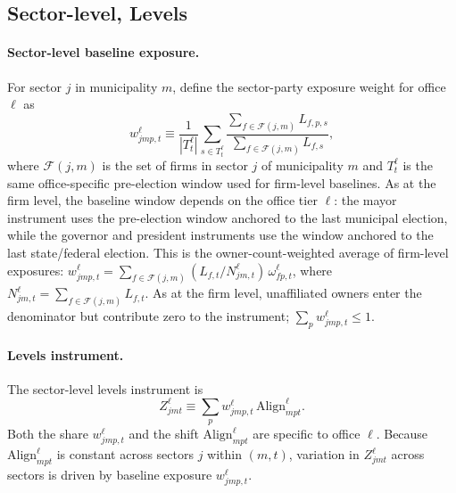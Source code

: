 \documentclass{article}
\newcommand{\Align}{\mathrm{Align}}
\begin{document}
\subsection{Sector-level, Levels}

\paragraph{Sector-level baseline exposure.}
For sector $j$ in municipality $m$, define the sector-party exposure weight for office $\ell$ as
\[
  w^\ell_{jmp,t} \equiv
  \frac{1}{|T^\ell_t|}\sum_{s\in T^\ell_t}
  \frac{\sum_{f\in\mathcal{F}(j,m)} L_{f,p,s}}
       {\sum_{f\in\mathcal{F}(j,m)} L_{f,s}},
\]
where $\mathcal{F}(j,m)$ is the set of firms in sector $j$ of municipality $m$
and $T^\ell_t$ is the same office-specific pre-election window used for firm-level baselines.
As at the firm level, the baseline window depends on the office tier $\ell$:
the mayor instrument uses the pre-election window anchored to the last municipal election,
while the governor and president instruments use the window anchored to the last state/federal election.
This is the owner-count-weighted average of firm-level exposures:
$w^\ell_{jmp,t} = \sum_{f\in\mathcal{F}(j,m)} (L_{f,t}/N^\ell_{jm,t})\,\omega^\ell_{fp,t}$,
where $N^\ell_{jm,t} = \sum_{f\in\mathcal{F}(j,m)} L_{f,t}$.
As at the firm level, unaffiliated owners enter the denominator but contribute zero
to the instrument; $\sum_p w^\ell_{jmp,t} \leq 1$.

\paragraph{Levels instrument.}
The sector-level levels instrument is
\[
  Z^{\ell}_{jmt} \equiv \sum_{p} w^\ell_{jmp,t}\,\Align^{\ell}_{mpt}.
\]
Both the share $w^\ell_{jmp,t}$ and the shift $\Align^{\ell}_{mpt}$ are specific to office $\ell$.
Because $\Align^{\ell}_{mpt}$ is constant across sectors $j$ within $(m,t)$,
variation in $Z^{\ell}_{jmt}$ across sectors is driven by baseline exposure $w^\ell_{jmp,t}$.
\end{document}
